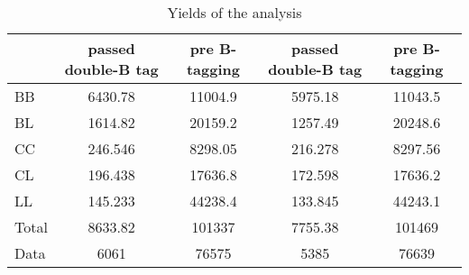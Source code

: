 \documentclass[10pt]{article}
\begin{document}
\begin{table}[htbp]
\begin{center}
\begin{tabular}{|l|S|S|S|S|}
\hline 
 & {passed double-B tag} & {pre B-tagging} & {passed double-B tag} & {pre B-tagging}\\
\hline 
  BB   & 6430.78  & 11004.9  & 5975.18  & 11043.5  \\ 
  BL   & 1614.82  & 20159.2  & 1257.49  & 20248.6  \\ 
  CC   & 246.546  & 8298.05  & 216.278  & 8297.56  \\ 
  CL   & 196.438  & 17636.8  & 172.598  & 17636.2  \\ 
  LL   & 145.233  & 44238.4  & 133.845  & 44243.1  \\ 
\hline 
  Total  & 8633.82  & 101337  & 7755.38  & 101469  \\ 
\hline 
  Data   & 6061 & 76575 & 5385 & 76639 \\ 
\hline 
\end{tabular} 
\caption{Yields of the analysis} 
\end{center} 
\end{table} 
\end{document}
